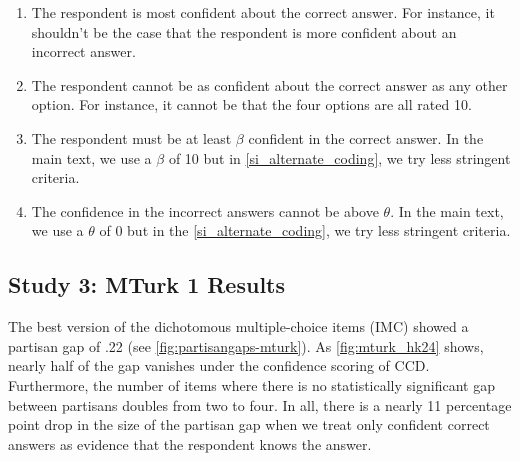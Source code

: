 \documentclass[12pt, letterpaper]{article}
\begin{document}
\begin{enumerate}

  \item The respondent is most confident about the correct answer. For instance, it shouldn't be the case that the respondent is more confident about an incorrect answer.

  \item The respondent cannot be as confident about the correct answer as any other option. For instance, it cannot be that the four options are all rated 10. 

  \item The respondent must be at least  $\beta$ confident in the correct answer. In the main text, we use a $\beta$ of 10 but in \cref{si_alternate_coding}, we try less stringent criteria.

  \item The confidence in the incorrect answers cannot be above $\theta$. In the main text, we use a $\theta$ of 0 but in the \cref{si_alternate_coding}, we try less stringent criteria.

\end{enumerate}

\subsection*{Study 3: MTurk 1 Results}

The best version of the dichotomous multiple-choice items (IMC) showed a partisan gap of .22 (see \cref{fig:partisangaps-mturk}). As \cref{fig:mturk_hk24} shows, nearly half of the gap vanishes under the confidence scoring of CCD. Furthermore, the number of items where there is no statistically significant gap between partisans doubles from two to four. In all, there is a nearly 11 percentage point drop in the size of the partisan gap when we treat only confident correct answers as evidence that the respondent knows the answer. 
\end{document}
